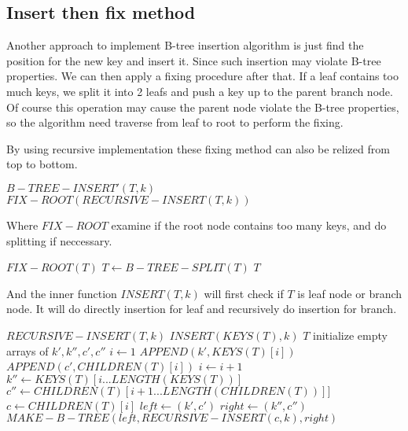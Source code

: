 \documentclass{article}
\begin{document}
\subsection{Insert then fix method}
Another approach to implement B-tree insertion algorithm is just find
the position for the new key and insert it. Since such insertion may
violate B-tree properties. We can then apply a fixing procedure after
that. If a leaf contains too much keys, we split it into 2 leafs and
push a key up to the parent branch node. Of course this operation
may cause the parent node violate the B-tree properties, so the 
algorithm need traverse from leaf to root to perform the fixing.

By using recursive implementation these fixing method can also be
relized from top to bottom.

\begin{algorithmic}
\STATE $B-TREE-INSERT'(T, k)$
  \RETURN $FIX-ROOT(RECURSIVE-INSERT(T, k))$
\end{algorithmic}

Where $FIX-ROOT$ examine if the root node contains too many keys,
and do splitting if neccessary.

\begin{algorithmic}
\STATE $FIX-ROOT(T)$
    \STATE $T \leftarrow B-TREE-SPLIT(T)$
  \ENDIF
  \RETURN $T$
\end{algorithmic}

And the inner function $INSERT(T, k)$ will first check if $T$ 
is leaf node or branch node. It will do directly insertion for leaf
and recursively do insertion for branch.

\begin{algorithmic}
\STATE $RECURSIVE-INSERT(T, k)$
    \STATE $INSERT(KEYS(T), k)$
    \RETURN $T$
  \ELSE
    \STATE initialize empty arrays of $k', k'', c', c''$
    \STATE $i \leftarrow 1$
      \STATE $APPEND(k', KEYS(T)[i])$
      \STATE $APPEND(c', CHILDREN(T)[i])$
      \STATE $i \leftarrow i+1$
    \ENDWHILE
    \STATE $k'' \leftarrow KEYS(T)[i...LENGTH(KEYS(T))]$
    \STATE $c'' \leftarrow CHILDREN(T)[i+1...LENGTH(CHILDREN(T))]]$
    \STATE $c \leftarrow CHILDREN(T)[i]$
    \STATE $left \leftarrow (k', c')$
    \STATE $right \leftarrow (k'', c'')$
    \RETURN $MAKE-B-TREE(left, RECURSIVE-INSERT(c, k), right)$
  \ENDIF
\end{algorithmic}
\end{document}
